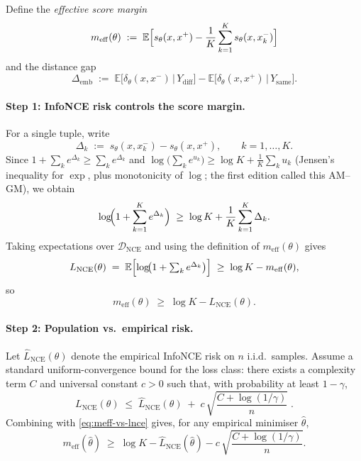 \documentclass[11pt]{article}
\theoremstyle{remark}
\theoremstyle{plain}
\begin{document}
Define the \emph{effective score margin}
\[
m_{\mathrm{eff}}(\theta)
\;:=\;
\mathbb{E}\Bigl[
s_\theta(x,x^{+}) - \frac{1}{K}\sum_{k=1}^K s_\theta(x,x_k^{-})
\Bigr]
\]
and the distance gap
\[
\Delta_{\mathrm{emb}}
\;:=\;
\mathbb{E}\bigl[\delta_\theta(x,x^{-}) \,\big|\, Y_{\mathrm{diff}}\bigr]
-
\mathbb{E}\bigl[\delta_\theta(x,x^{+}) \,\big|\, Y_{\mathrm{same}}\bigr].
\]

\paragraph{Step 1: InfoNCE risk controls the score margin.}
For a single tuple, write
\[
\Delta_k
\;:=\;
s_\theta(x,x_k^{-}) - s_\theta(x,x^{+}), \qquad
k=1,\dots,K.
\]
Since $1+\sum_{k}e^{\Delta_k} \ge \sum_{k}e^{\Delta_k}$ and $\log\!\big(\sum_k e^{u_k}\big) \ge
\log K + \frac{1}{K}\sum_k u_k$ (Jensen's inequality for $\exp$, plus monotonicity of $\log$; the first edition called this AM–GM), we obtain
\[
\log\!\Bigl(1+\sum_{k=1}^K e^{\Delta_k}\Bigr)
\;\ge\;
\log K + \frac{1}{K}\sum_{k=1}^K \Delta_k.
\]
Taking expectations over $\mathcal{D}_{\mathrm{NCE}}$ and using the definition of
$m_{\mathrm{eff}}(\theta)$ gives
\[
L_{\mathrm{NCE}}(\theta)
\;=\;
\mathbb{E}\Bigl[\log\!\bigl(1+\textstyle\sum_{k} e^{\Delta_k}\bigr)\Bigr]
\;\ge\;
\log K - m_{\mathrm{eff}}(\theta),
\]
so
\begin{equation}
m_{\mathrm{eff}}(\theta) \;\ge\; \log K - L_{\mathrm{NCE}}(\theta).
\label{eq:meff-vs-lnce}
\end{equation}

\paragraph{Step 2: Population vs.~empirical risk.}
Let $\widehat{L}_{\mathrm{NCE}}(\theta)$ denote the empirical InfoNCE risk on $n$ i.i.d.~samples.
Assume a standard uniform-convergence bound for the loss class:
there exists a complexity term $C$ and universal constant $c>0$ such that, with probability at
least $1-\gamma$,
\[
L_{\mathrm{NCE}}(\theta)
\;\le\;
\widehat{L}_{\mathrm{NCE}}(\theta)
\;+\;
c\,\sqrt{\frac{C + \log(1/\gamma)}{n}}\;.
\]
Combining with \eqref{eq:meff-vs-lnce} gives, for any empirical minimiser $\hat\theta$,
\begin{equation}
m_{\mathrm{eff}}(\hat\theta)
\;\ge\;
\log K - \widehat{L}_{\mathrm{NCE}}(\hat\theta)
- c\,\sqrt{\frac{C + \log(1/\gamma)}{n}}.
\label{eq:meff-lower-bound}
\end{equation}
\end{document}
